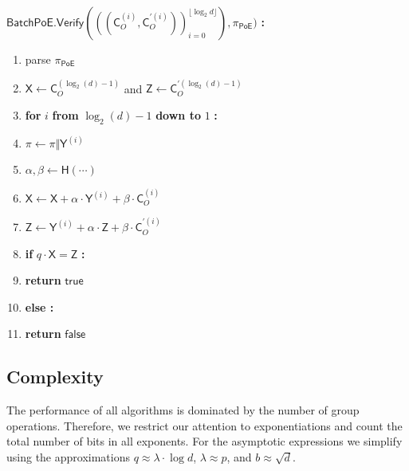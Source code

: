 \documentclass[10pt,conference]{IEEEtran}
\theoremstyle{Definition}
\begin{document}
\begin{mdframed}
$\mathsf{BatchPoE.Verify}(((\mathsf{C}_O^{(i)}, \mathsf{C}_O^{\prime(i)}))_{i=0}^{\lfloor \log_2 d \rfloor}), \pi_{\mathsf{PoE}})$ \textbf{:}
\begin{enumerate}[nolistsep]
	\item parse $\pi_{\mathsf{PoE}}$
	\item $\mathsf{X} \gets \mathsf{C}_O^{(\log_2(d)-1)}$ and $\mathsf{Z} \gets \mathsf{C}_O^{\prime(\log_2(d)-1)}$
	\item \textbf{for} $i$ \textbf{from} $\log_2(d) - 1$ \textbf{down to} $1$ \textbf{:}
	\item \pcind $\pi \gets \pi \Vert \mathsf{Y}^{(i)}$
	\item \pcind $\alpha, \beta \gets \mathsf{H}(\cdots)$
	\item \pcind $\mathsf{X} \gets \mathsf{X} + \alpha \cdot \mathsf{Y}^{(i)} + \beta \cdot \mathsf{C}_O^{(i)}$
	\item \pcind $\mathsf{Z} \gets \mathsf{Y}^{(i)} + \alpha \cdot \mathsf{Z} + \beta \cdot \mathsf{C}_O^{\prime(i)}$
	\item \textbf{if} $q \cdot \mathsf{X} = \mathsf{Z}$ \textbf{:}
	\item \pcind \textbf{return} $\mathsf{true}$
	\item \textbf{else :}
	\item \pcind \textbf{return} $\mathsf{false}$
\end{enumerate}
\end{mdframed}

\subsection{Complexity}

The performance of all algorithms is dominated by the number of group operations. Therefore, we restrict our attention to exponentiations and count the total number of bits in all exponents. For the asymptotic expressions we simplify using the approximations $q \approx \lambda \cdot \log d$, $\lambda \approx p$, and $b \approx \sqrt{d}$.
\end{document}
